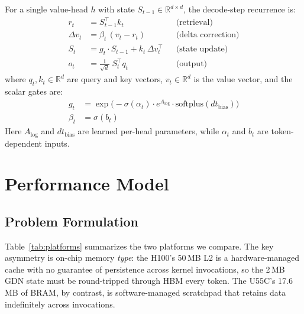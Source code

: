 \documentclass[conference]{IEEEtran}
\begin{document}
For a single value-head $h$ with state
$S_{t-1} \in \mathbb{R}^{d \times d}$, the decode-step recurrence is:
%
\begin{align}
  r_t &= S_{t-1}^{\!\top} k_t
  & &\text{(retrieval)} \label{eq:retrieval} \\
  \Delta v_t &= \beta_t\,(v_t - r_t)
  & &\text{(delta correction)} \label{eq:delta} \\
  S_t &= g_t \cdot S_{t-1} + k_t \, \Delta v_t^{\!\top}
  & &\text{(state update)} \label{eq:update} \\
  o_t &= \tfrac{1}{\sqrt{d}}\; S_t^{\!\top} q_t
  & &\text{(output)} \label{eq:output}
\end{align}
%
where $q_t, k_t \in \mathbb{R}^d$ are query and key vectors,
$v_t \in \mathbb{R}^d$ is the value vector, and the scalar gates are:
%
\begin{align}
  g_t &= \exp\!\bigl(-\sigma(\alpha_t) \cdot e^{A_{\log}} \cdot
         \mathrm{softplus}(dt_{\mathrm{bias}})\bigr) \label{eq:gate_g} \\
  \beta_t &= \sigma(b_t) \label{eq:gate_beta}
\end{align}
%
Here $A_{\log}$ and $dt_{\mathrm{bias}}$ are learned per-head parameters,
while $\alpha_t$ and $b_t$ are token-dependent inputs.

\section{Performance Model}

\subsection{Problem Formulation}

Table~\ref{tab:platforms} summarizes the two platforms we compare.
The key asymmetry is on-chip memory \emph{type}: the H100's 50\,MB
L2 is a hardware-managed cache with no guarantee of persistence
across kernel invocations, so the 2\,MB GDN state must be
round-tripped through HBM every token. The U55C's 17.6\,MB of BRAM,
by contrast, is software-managed scratchpad that retains data
indefinitely across invocations.
\end{document}

